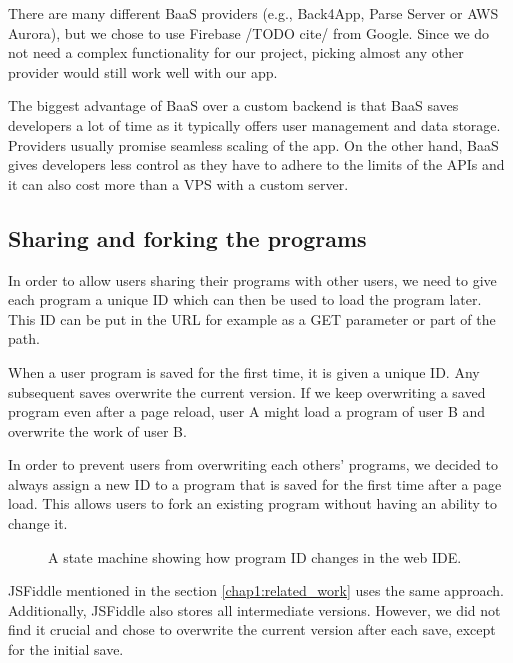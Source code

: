 There are many different BaaS providers (e.g., Back4App, Parse Server or AWS Aurora), but we chose to use Firebase /TODO cite/ from Google. Since we do not
need a complex functionality for our project, picking almost any other provider would still work well with our app.

The biggest advantage of BaaS over a custom backend is that BaaS saves developers a lot of time as it typically offers user management and data storage.
Providers usually promise seamless scaling of the app. On the other hand, BaaS gives developers less control as they have to adhere to the limits of the APIs
and it can also cost more than a VPS with a custom server.

\subsection{Sharing and forking the programs}
\label{chap2:program_id}

In order to allow users sharing their programs with other users, we need to give each program a unique ID which can then be used to load the program later.
This ID can be put in the URL for example as a GET parameter or part of the path.

When a user program is saved for the first time, it is given a unique ID. Any subsequent saves overwrite the current version. If we keep overwriting
a saved program even after a page reload, user A might load a program of user B and overwrite the work of user B.

In order to prevent users from overwriting each others' programs, we decided to always assign a new ID to a program that is saved for the first time after
a page load. This allows users to fork an existing program without having an ability to change it.

\begin{figure}[!hbt]
    \centering
	\caption{A state machine showing how program ID changes in the web IDE.}
	\label{fig:chap2:page_url}
\end{figure}

JSFiddle mentioned in the section \ref{chap1:related_work} uses the same approach. Additionally, JSFiddle also stores all intermediate versions. However,
we did not find it crucial and chose to overwrite the current version after each save, except for the initial save.
